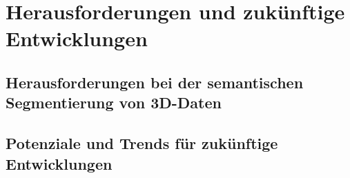 \chapter{Herausforderungen und zukünftige Entwicklungen}
\section{Herausforderungen bei der semantischen Segmentierung von 3D-Daten}
\section{Potenziale und Trends für zukünftige Entwicklungen}
